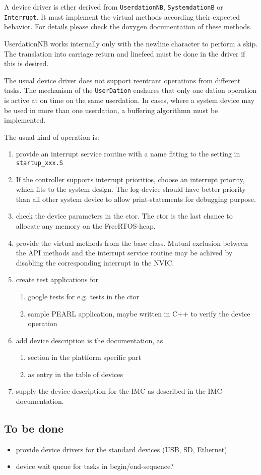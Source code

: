 A device driver is ether derived from \verb|UserdationNB|,
 \verb|SystemdationB| or \verb|Interrupt|.
It must implement the virtual methods according their
expected behavior. For details please check the doxygen documentation
of these methods.

UserdationNB works internally only with the newline character to 
perform a skip. The translation into carriage return and linefeed must
be done in the driver if this is desired.

The usual device driver does not support reentrant operations from
different tasks. 
The mechanism of the \verb|UserDation| enshures that only one dation
operation is active at on time on the same userdation. In cases, where
a system device may be used in more than one userdation, a buffering
algorithmn must be implemented. 

The usual kind of operation is:
\begin{enumerate}
\item provide an interrupt service routine with a name fitting to the
   setting in \verb|startup_xxx.S|
\item If the controller supports interrupt prioritios,
choose an interrupt priority, which fits to the system design.
 The log-device should have better priority than all other
 system device to allow print-statements for debugging purpose.
\item check the device parameters in the ctor. The ctor is the last chance to
   allocate any memory on the FreeRTOS-heap.
\item provide the virtual methods from the base class. Mutual exclusion
   between the API methods and the interrupt service routine may
   be achived by disabling the corresponding interrupt in the NVIC.
\item create test applications for 
  \begin{enumerate}
  \item google tests for e.g. tests in the ctor
  \item sample PEARL application, maybe  written in C++ to verify
        the device operation
  \end{enumerate}
\item add device description is the documentation, as
  \begin{enumerate}
  \item section in the plattform specific part
  \item as entry in the table of devices
  \end{enumerate}
\item supply the device description for the IMC as described in the IMC-documentation.
\end{enumerate}




\subsection{To be done}
  \begin{itemize}
  \item provide device drivers for the standard devices (USB, SD, Ethernet)
  \item device wait queue for tasks in begin/end-sequence?
  \end{itemize}


